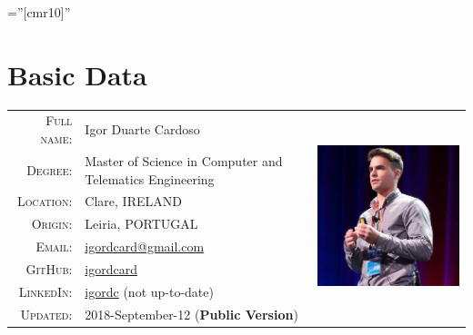 \documentclass[letter,10pt]{article} %
\begin{document}
\pagestyle{empty} %

\font\fb=''[cmr10]'' %



\par{\bigskip\par} %

\section{Basic Data}

\begin{tabular}{rlr}
\textsc{Full name:} & Igor Duarte Cardoso & \multirow{9}{*}{\includegraphics[scale=0.5]{avatar.jpg}} \\
\textsc{Degree:} & Master of Science in Computer and Telematics Engineering & \\
\textsc{Location:} & Clare, IRELAND & \\
\textsc{Origin:} & Leiria, PORTUGAL & \\
\textsc{Email:} & \href{mailto:igordcard+cv@gmail.com}{igordcard@gmail.com} & \\
\textsc{GitHub:} & \href{https://github.com/igordcard}{igordcard} & \\
\textsc{LinkedIn:} & \href{https://linkedin.com/in/igordc}{igordc} (not up-to-date) & \\
\textsc{Updated:} & 2018-September-12 (\textbf{Public Version}) & \\
\end{tabular} \\
\end{document}
